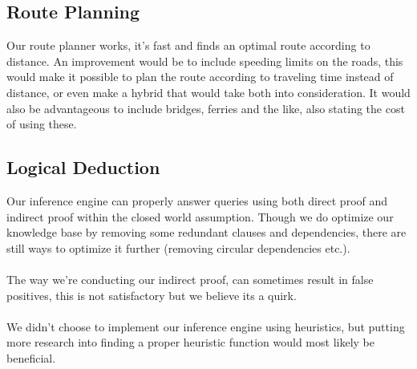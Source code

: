 \documentclass[11pt]{article}
\begin{document}
\subsection{Route Planning}
Our route planner works, it's fast and finds an optimal route according to distance. An improvement would be to include speeding limits on the roads, this would make it possible to plan the route according to traveling time instead of distance, or even make a hybrid that would take both into consideration. It would also be advantageous to include bridges, ferries and the like, also stating the cost of using these.

\subsection{Logical Deduction}
Our inference engine can properly answer queries using both direct proof and indirect proof within the closed world assumption. Though we do optimize our knowledge base by removing some redundant clauses and dependencies, there are still ways to optimize it further (removing circular dependencies etc.).\\
\\
The way we're conducting our indirect proof, can sometimes result in false positives, this is not satisfactory but we believe its a quirk. 
\\
\\
We didn't choose to implement our inference engine using heuristics, but putting more research into finding a proper heuristic function would most likely be beneficial.
\end{document}
